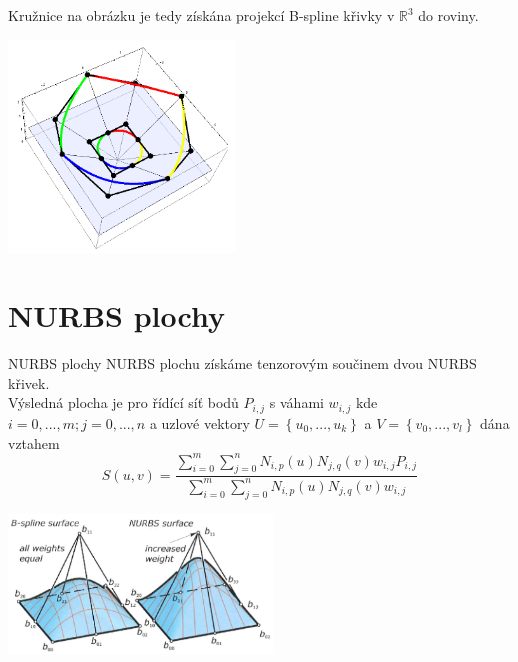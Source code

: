 \documentclass[hyperref={unicode}]{beamer}
\begin{document}
\begin{frame}
Kružnice na obrázku je tedy získána projekcí B-spline křivky v $\mathbb{R}^3$ do roviny.
\begin{center}
\includegraphics[width=6cm]{obrazky/NURBS-projection.png}
\end{center}
\end{frame}

\section{NURBS plochy}
\begin{frame}{NURBS plochy}
NURBS plochu získáme tenzorovým součinem dvou NURBS křivek.
\\\medskip
Výsledná plocha je pro řídící síť bodů $P_{i,j}$ s váhami $w_{i,j}$ kde $i=0,...,m;j=0,...,n$ a uzlové vektory $U=\left\lbrace u_0,...,u_k\right\rbrace$ a $V=\left\lbrace v_0,...,v_l\right\rbrace$ dána vztahem
$$S\left(u,v\right)=\frac{\sum_{i=0}^{m}\sum_{j=0}^{n}N_{i,p}\left(u\right)N_{j,q}\left(v\right)w_{i,j}P_{i,j}}{\sum_{i=0}^{m}\sum_{j=0}^{n}N_{i,p}\left(u\right)N_{j,q}\left(v\right)w_{i,j}}$$
\begin{center}
\includegraphics[width=7cm]{obrazky/nurbs-surface.png}
\end{center}
\end{frame}
\end{document}
